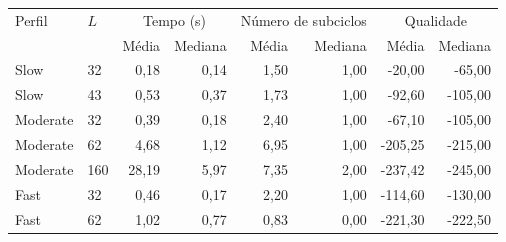 \begin{tabular}{llrrrrrr}
\hline
Perfil & $L$ & \multicolumn{2}{c}{Tempo (s)} & \multicolumn{2}{c}{Número de subciclos} & \multicolumn{2}{c}{Qualidade} \\
 & & Média & Mediana & Média & Mediana & Média & Mediana \\
\hline
Slow & 32 & 0,18 & 0,14 & 1,50 & 1,00 & -20,00 & -65,00 \\
Slow & 43 & 0,53 & 0,37 & 1,73 & 1,00 & -92,60 & -105,00 \\
Moderate & 32 & 0,39 & 0,18 & 2,40 & 1,00 & -67,10 & -105,00 \\
Moderate & 62 & 4,68 & 1,12 & 6,95 & 1,00 & -205,25 & -215,00 \\
Moderate & 160 & 28,19 & 5,97 & 7,35 & 2,00 & -237,42 & -245,00 \\
Fast & 32 & 0,46 & 0,17 & 2,20 & 1,00 & -114,60 & -130,00 \\
Fast & 62 & 1,02 & 0,77 & 0,83 & 0,00 & -221,30 & -222,50 \\
\hline
\end{tabular}